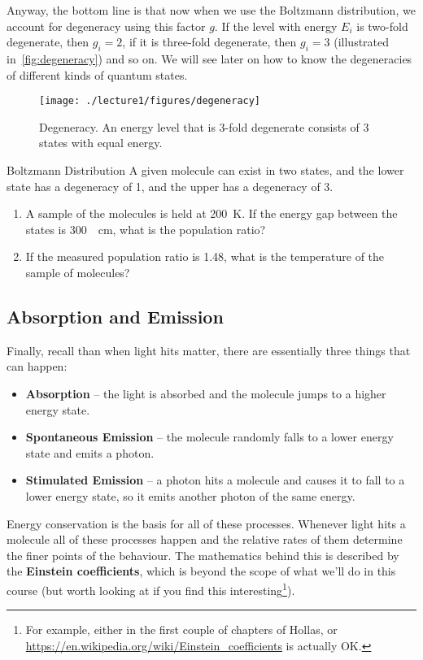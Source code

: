 Anyway, the bottom line is that now when we use the Boltzmann distribution, we account for degeneracy using this factor $g$. If the level with energy $E_i$ is two-fold degenerate, then $g_i =  2$, if it is three-fold degenerate, then $g_i = 3$ (illustrated in~\autoref{fig:degeneracy}) and so on. We will see later on how to know the degeneracies of different kinds of quantum states. 

\begin{figure}
\centering
\texttt{[image: ./lecture1/figures/degeneracy]}
\caption{Degeneracy. An energy level that is 3-fold degenerate consists of 3 states with equal energy.}\label{fig:degeneracy}
\end{figure}

\begin{exercise}{Boltzmann Distribution}
A given molecule can exist in two states, and the lower state has a degeneracy of 1, and the upper has a degeneracy of 3.
\begin{enumerate}
\item A sample of the molecules is held at \SI{200}{\kelvin}. If the energy gap between the states is \SI{300}{\per\centi\meter}, what is the population ratio?
\item If the measured population ratio is 1.48, what is the temperature of the sample of molecules?
\end{enumerate}
\end{exercise}

\subsection{Absorption and Emission}
Finally, recall than when light hits matter, there are essentially three things that can happen:
\begin{itemize}
\item \textbf{Absorption} -- the light is absorbed and the molecule jumps to a higher energy state.
\item \textbf{Spontaneous Emission} -- the molecule randomly falls to a lower energy state and emits a photon.
\item \textbf{Stimulated Emission} -- a photon hits a molecule and causes it to fall to a lower energy state, so it emits another photon of the same energy.
\end{itemize}
Energy conservation is the basis for all of these processes. Whenever light hits a molecule all of these processes happen and the relative rates of them determine the finer points of the behaviour. The mathematics behind this is described by the \textbf{Einstein coefficients}, which is beyond the scope of what we'll do in this course (but worth looking at if you find this interesting\footnote{For example, either in the first couple of chapters of Hollas, or \url{https://en.wikipedia.org/wiki/Einstein_coefficients} is actually OK.}).

